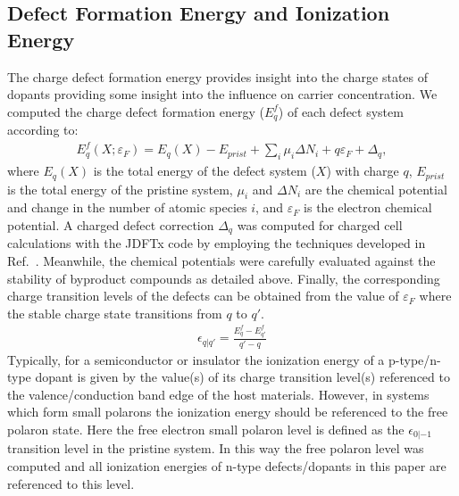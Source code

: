 \subsection{Defect Formation Energy and Ionization Energy}
The charge defect formation energy provides insight into the charge states of dopants providing some insight into the influence on carrier concentration.
We computed the charge defect formation energy ($E^f_q$) of each defect system according to:
\begin{align}
    E^f_q(X; \varepsilon_F) = E_q(X) - E_{prist} + \sum_i \mu_i \Delta N_i + q \varepsilon_F + \Delta_q,
    \label{eq:cfe}
\end{align}
where $E_q(X)$ is the total energy of the defect system ($X$) with charge $q$, $E_{prist}$ is the total energy of the pristine system, $\mu_i$ and $\Delta N_i$ are the chemical potential and change in the number of atomic species $i$, and $\varepsilon_F$ is the electron chemical potential. A charged defect correction $\Delta_q$ was computed for charged cell calculations with the JDFTx code \cite{JDFTx} by employing the techniques developed in Ref.~\cite{wu2017first,Ping2013}. Meanwhile, the chemical potentials were carefully evaluated against the stability of byproduct compounds as detailed above.
Finally, the corresponding charge transition levels of the defects can be obtained from the value of $\varepsilon_F$ where the stable charge state transitions from $q$ to $q'$.
\begin{align}
    \epsilon_{q|q'} = \frac{E^f_q - E^f_{q'}}{q' - q}
    \label{eq:ctl}
\end{align}
Typically, for a semiconductor or insulator the ionization energy of a p-type/n-type dopant is given by the value(s) of its charge transition level(s) referenced to the valence/conduction band edge of the host materials. However, in systems which form small polarons the ionization energy should be referenced to the free polaron state. \cite{seo2018role} Here the free electron small polaron level is defined as the $\epsilon_{0|-1}$ transition level in the pristine system. In this way the free polaron level was computed and all ionization energies of n-type defects/dopants in this paper are referenced to this level.



